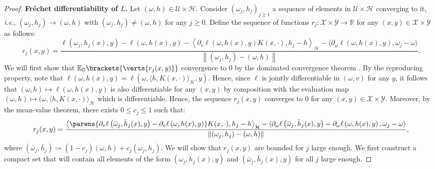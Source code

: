 \begin{proof}
	{\bf Fr\'echet differentiability of $L$.} 
	Let $(\omega, h)\in \mathcal{U}\times \mathcal{H}$. Consider $(\omega_j,h_j)_{j\geq 1}$ a sequence of elements in $\mathcal{U}\times \mathcal{H}$ converging to it, \textit{i.e.}, $(\omega_j,h_j)\rightarrow (\omega,h)$ with $(\omega_j,h_j)\neq (\omega,h)$ for any $j\geq 0$.    
	Define the sequence of functions $r_j:\mathcal{X}\times\mathcal{Y}\to\mathbb{R}$ for any $(x,y)\in\mathcal{X}\times\mathcal{Y}$ as follows:
    \begin{equation}\label{eq:expression_rn}
r_j(x,y)=\frac{\ell\left(\omega_j,h_j(x),y\right)-\ell\left(\omega,h(x),y\right)-\left\langle\partial_v\ell\left(\omega,h(x),y\right)K(x,\cdot),h_j-h\right\rangle_\mathcal{H}- \langle \partial_{\omega}\ell(\omega,h(x),y),\omega_j-\omega\rangle}{\left\|(\omega_j,h_j)-(\omega,h)\right\|}.
    \end{equation}    
    We will first show that $\mathbb{E}_{\mathbb{D}}\brackets{\verts{r_j(x,y)}}$ convergence to $0$ by the dominated convergence theorem \citep[Theorem~1.34]{rudin1987real}. 
	By the reproducing property, note that $\ell(\omega,h(x),y) = \ell(\omega,\langle h,K(x,\cdot)\rangle_{\mathcal{H}},y)$. Hence, since $\ell$ is jointly differentiable in $(\omega,v)$ for any $y$, it follows that $(\omega,h)\mapsto \ell(\omega,h(x),y)$ is also differentiable for any $(x,y)$ by composition with the evaluation map $(\omega,h)\mapsto (\omega, \langle h,K(x,\cdot)\rangle_{\mathcal{H}}$ which is differentiable. Hence, the sequence $r_j(x,y)$ converges to $0$ for any $(x,y)\in \mathcal{X}\times \mathcal{Y}$. Moreover, by the mean-value theorem, there exists $0\leq c_j\leq 1$ such that:
	\begin{align*}
		r_j(x,y)= \frac{\left\langle\parens{\partial_v\ell\left(\bar{\omega}_j,\bar{h}_j(x),y\right)- \partial_v\ell\left(\omega,h(x),y\right)}K(x,\cdot),h_j-h\right\rangle_\mathcal{H}- \langle \partial_{\omega}\ell\left(\bar{\omega}_j,\bar{h}_j(x),y\right)- \partial_{\omega}\ell\left(\omega,h(x),y\right),\omega_j-\omega\rangle}{\left\|(\omega_j,h_j)-(\omega,h)\right\|},
	\end{align*}
	where $(\bar{\omega}_j,\bar{h}_j)\coloneqq(1-c_j)(\omega,h) + c_j(\omega_j,h_j)$. 
	We will show that $r_j(x,y)$ are bounded for $j$ large enough. We first construct a compact set that will contain all elements of the form $(\omega_j, h_j(x),y)$ and $(\bar{\omega}_j, \bar{h}_j(x),y)$ for all $j$ large enough. 

\end{proof}
